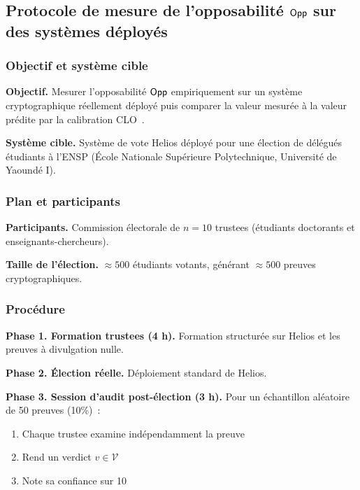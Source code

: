 \subsection{Protocole de mesure de l'opposabilit\'e $\mathsf{Opp}$ sur des syst\`emes d\'eploy\'es}
\label{subsec:protocole_opp}
\begin{sloppypar}

\subsubsection{Objectif et syst\`eme cible}
\label{subsubsec:objectif_opp}

\noindent\textbf{Objectif.} Mesurer l'opposabilit\'e $\mathsf{Opp}$ empiriquement sur
un syst\`eme cryptographique r\'eellement d\'eploy\'e puis comparer la valeur
mesur\'ee \`a la valeur pr\'edite par la calibration CLO~\cite{MINKA2026CLO,MINKA2026SOTP}.

\noindent\textbf{Syst\`eme cible.} Syst\`eme de vote Helios d\'eploy\'e pour
une \'election de d\'el\'egu\'es \'etudiants \`a l'ENSP (\'Ecole Nationale
Sup\'erieure Polytechnique, Universit\'e de Yaound\'e I).

\subsubsection{Plan et participants}
\label{subsubsec:design_opp}

\noindent\textbf{Participants.} Commission \'electorale de $n = 10$ trustees
(\'etudiants doctorants et enseignants-chercheurs).

\noindent\textbf{Taille de l'\'election.} $\approx 500$ \'etudiants votants,
g\'en\'erant $\approx 500$ preuves cryptographiques.

\subsubsection{Proc\'edure}
\label{subsubsec:procedure_opp}

\noindent\textbf{Phase 1. Formation trustees (4 h).}
Formation structur\'ee sur Helios et les preuves \`a divulgation nulle.

\noindent\textbf{Phase 2. \'Election r\'eelle.}
D\'eploiement standard de Helios.

\noindent\textbf{Phase 3. Session d'audit post-\'election (3 h).}
Pour un \'echantillon al\'eatoire de 50 preuves (10\%)~:
\begin{enumerate}
\item Chaque trustee examine ind\'ependamment la preuve
\item Rend un verdict $v \in \mathcal{V}$
\item Note sa confiance sur 10
\end{enumerate}


\end{sloppypar}
